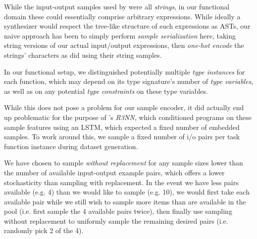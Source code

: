 \documentclass{article} %
\begin{document}
    While the input-output samples used by \citet{nsps} were all \emph{strings},
    in our functional domain these could essentially comprise arbitrary expressions.
    While ideally a synthesizer would respect the tree-like structure of such expressions as ASTs,
    our naive approach has been to simply perform \emph{sample serialization} here,
    taking string versions of our actual input/output expressions,
    then \emph{one-hot encode} the strings' characters as \citet{nsps} did using their string samples.

    In our functional setup,
    we distinguished potentially multiple \emph{type instances} for each function,
    which may depend on its type signature's number of \emph{type variables},
    as well as on any potential \emph{type constraints} on these type variables.


    While this does not pose a problem for our sample encoder,
    it did actually end up problematic for the purpose of \citet{nsps}'s \emph{R3NN},
    which conditioned programs on these sample features using an LSTM,
    which expected a fixed number of embedded samples.
    To work around this,
    we sample a fixed number of i/o pairs per task function instance during dataset generation.

    We have chosen to sample \emph{without replacement} for any
    sample sizes lower than the number of available input-output example pairs,
    which offers a lower stochasticity than sampling with replacement.
    In the event we have less pairs available (e.g. 4) than we would like to sample (e.g. 10),
    we would first take each available pair while we still wish to sample more items than are available in the pool (i.e. first sample the 4 available pairs twice),
    then finally use sampling without replacement to uniformly sample the remaining desired pairs (i.e. randomly pick 2 of the 4).
\end{document}
